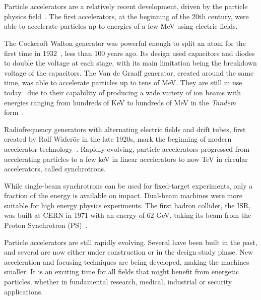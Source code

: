 \section{}

Particle accelerators are a relatively recent development, driven by the particle physics
field~\cite{bryant_brief_1994}. The first accelerators, at the beginning of the 20th century, were
able to accelerate particles up to energies of a few MeV using electric fields.

The Cockcroft Walton generator was powerful enough to split an atom for the first time in
1932~\cite{poole_cockcrofts_2007}, less than 100 years ago. Its design used capacitors and diodes
to double the voltage at each stage, with its main limitation being the breakdown voltage of the
capacitors. The Van de Graaff generator, created around the same time, was able to accelerate
particles up to tens of MeV. They are still in use today~\cite{lebois_rapport_2020} due to their
capability of producing a wide variety of ion beams with energies ranging from hundreds of KeV to
hundreds of MeV in the \textit{Tandem} form~\cite{hinterberger_electrostatic_2006}.

Radiofrequency generators with alternating electric fields and drift tubes, first created by 
Rolf Wideröe in the late 1920s, mark the beginning of modern accelerator
technology~\cite{vretenar_radio_2011}. Rapidly evolving, particle accelerators progressed from
accelerating particles to a few keV in linear accelerators to now TeV in circular accelerators,
called synchrotrons.

While single-beam synchrotrons can be used for fixed-target experiments, only a fraction of the
energy is available on impact. Dual-beam machines were more suitable for high energy physics
experiments. The first hadron collider, the ISR, was built at CERN in 1971 with an energy
of 62 GeV, taking its beam from the Proton Synchrotron (PS)~\cite{philip_cerns_2011}. 

Particle accelerators are still rapidly evolving. Several have been built in the past, and several
are now either under construction or in the design study phase. New acceleration and focusing
techniques are being developed, making the machines smaller. It is an exciting time for all fields
that might benefit from energetic particles, whether in fundamental research, medical, industrial or
security applications.


